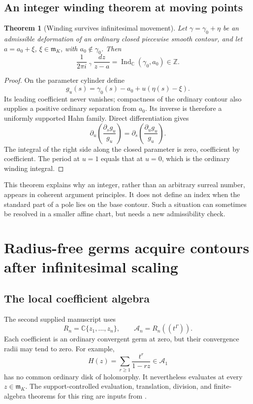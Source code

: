 \documentclass[11pt,letterpaper]{article}
\newtheorem{theorem}{Theorem}[section]
\theoremstyle{definition}
\theoremstyle{remark}
\newcommand{\C}{\mathbb C}
\newcommand{\Z}{\mathbb Z}
\newcommand{\Acal}{\mathscr A}
\newcommand{\m}{\mathfrak m}
\newcommand{\Ind}{\operatorname{Ind}}
\newcommand{\HCoint}{\mathop{\oint^{\!H}}\nolimits}
\numberwithin{equation}{section}
\begin{document}
\subsection{An integer winding theorem at moving points}
\begin{theorem}[Winding survives infinitesimal movement]\label{thm:winding}
Let $\gamma=\gamma_0+\eta$ be an admissible deformation of an ordinary closed piecewise smooth contour, and let $a=a_0+\xi$, $\xi\in\m_K$, with $a_0\notin\gamma_0$. Then
\begin{equation}\label{eq:winding}
\frac1{2\pi i}\HCoint_\gamma\frac{dz}{z-a}
=\Ind_{\C}(\gamma_0,a_0)\in\Z.
\end{equation}
\end{theorem}
\begin{proof}
On the parameter cylinder define
\[
g_u(s)=\gamma_0(s)-a_0+u(\eta(s)-\xi).
\]
Its leading coefficient never vanishes; compactness of the ordinary contour also supplies a positive ordinary separation from $a_0$. Its inverse is therefore a uniformly supported Hahn family. Direct differentiation gives
\[
\partial_u\left(\frac{\partial_sg_u}{g_u}\right)
=\partial_s\left(\frac{\partial_ug_u}{g_u}\right).
\]
The integral of the right side along the closed parameter is zero, coefficient by coefficient. The period at $u=1$ equals that at $u=0$, which is the ordinary winding integral.
\end{proof}
This theorem explains why an integer, rather than an arbitrary surreal number, appears in coherent argument principles. It does not define an index when the standard part of a pole lies on the base contour. Such a situation can sometimes be resolved in a smaller affine chart, but needs a new admissibility check.

\section{Radius-free germs acquire contours after infinitesimal scaling}\label{sec:radiusfree}
\subsection{The local coefficient algebra}
The second supplied manuscript uses
\begin{equation}\label{eq:An}
R_n=\C\{z_1,\ldots,z_n\},\qquad
\Acal_n=R_n((t^\Gamma)).
\end{equation}
Each coefficient is an ordinary convergent germ at zero, but their convergence radii may tend to zero. For example,
\begin{equation}\label{eq:shrinking}
H(z)=\sum_{r\ge1}\frac{t^r}{1-rz}\in\Acal_1
\end{equation}
has no common ordinary disk of holomorphy. It nevertheless evaluates at every $z\in\m_K$. The support-controlled evaluation, translation, division, and finite-algebra theorems for this ring are inputs from \cite{AG}.
\end{document}
